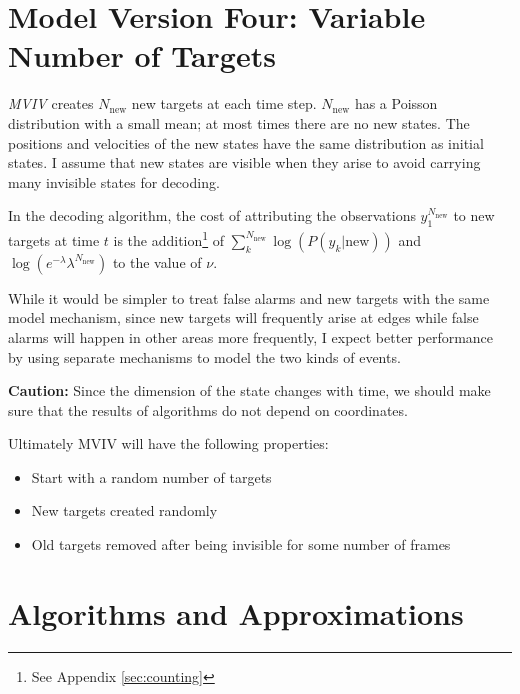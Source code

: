 \documentclass[12pt]{article}
\begin{document}
\section{Model Version Four: Variable Number of Targets}
\label{sec:model4}

\emph{MVIV} creates $N_{\text{new}}$ new targets at each time step.
$N_{\text{new}}$ has a Poisson distribution with a small mean; at most
times there are no new states.  The positions and velocities of the
new states have the same distribution as initial states.  I assume
that new states are visible when they arise to avoid carrying many
invisible states for decoding.

In the decoding algorithm, the cost of attributing the observations
$y_1^{N_{\text{new}}}$ to new targets at time $t$ is the
addition\footnote{See Appendix \ref{sec:counting}} of
$\sum_k^{N_{\text{new}}} \log(P(y_k|\text{new}))$ and $\log \left(
  e^{-\lambda} \lambda^{N_{\text{new}}}\right)$ to the value of
$\nu$.

While it would be simpler to treat false alarms and new targets with
the same model mechanism, since new targets will frequently arise at
edges while false alarms will happen in other areas more frequently, I
expect better performance by using separate mechanisms to model the
two kinds of events.

\textbf{Caution:} Since the dimension of the state changes with time,
we should make sure that the results of algorithms do not depend on
coordinates.

Ultimately MVIV will have the following properties:
\begin{itemize}
\item Start with a random number of targets
\item New targets created randomly
\item Old targets removed after being invisible for some number of
  frames
\end{itemize}

\section{Algorithms and Approximations}
\label{sec:algorithms}
\end{document}
